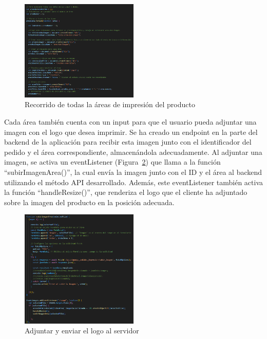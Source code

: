\documentclass[12pt]{article}
\begin{document}
\begin{figure}[ht]
    \centering
    \includegraphics[width=0.5\textwidth]{imagenesUS3-modal/recorrerAreasyMostrar.png}
    \caption{\label{fig:recorrerAreas} Recorrido de todas la áreas de impresión del producto}
    \vspace{\fill}
\end{figure}

Cada área también cuenta con un input para que el usuario pueda adjuntar una imagen con el logo que desea imprimir. Se ha creado un endpoint en 
la parte del backend de la aplicación para recibir esta imagen junto con el identificador del pedido y el área correspondiente, 
almacenándola adecuadamente. Al adjuntar una imagen, se activa un eventListener (Figura~\ref{fig:adjuntarLogo}) que llama a la función ``subirImagenArea()'', 
la cual envía la imagen junto con el ID y el área al backend utilizando el método API desarrollado. Además, este eventListener 
también activa la función ``handleResize()'', que renderiza el logo que el cliente ha adjuntado sobre la imagen del producto en la posición adecuada.

\begin{figure}[ht]
    \centering
    \includegraphics[width=0.5\textwidth]{imagenesUS3-modal/AdjuntarLogoFetch.png}
    \caption{\label{fig:adjuntarLogo} Adjuntar y enviar el logo al servidor}
    \vspace{\fill}
\end{figure}
\end{document}
